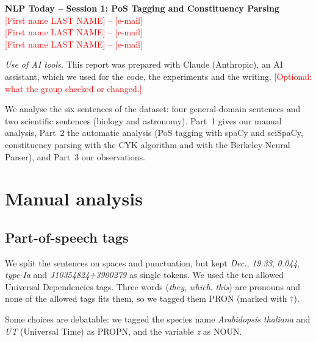 \documentclass[11pt,a4paper]{article}
\begin{document}
\begin{center}
  {\Large\bfseries NLP Today -- Session 1: PoS Tagging and Constituency Parsing}\\[8pt]
  \textcolor{red}{[First name LAST NAME] -- [e-mail]}\\
  \textcolor{red}{[First name LAST NAME] -- [e-mail]}\\
  \textcolor{red}{[First name LAST NAME] -- [e-mail]}
\end{center}

\noindent\textit{Use of AI tools.} This report was prepared with Claude (Anthropic), an AI assistant, which we used for the code, the experiments and the writing. \textcolor{red}{[Optional: what the group checked or changed.]}

\medskip
\noindent We analyse the six sentences of the dataset: four general-domain sentences and two scientific sentences (biology and astronomy). Part~1 gives our manual analysis, Part~2 the automatic analysis (PoS tagging with spaCy and sciSpaCy, constituency parsing with the CYK algorithm and with the Berkeley Neural Parser), and Part~3 our observations.

\section{Manual analysis}

\subsection{Part-of-speech tags}
We split the sentences on spaces and punctuation, but kept \emph{Dec.}, \emph{19.33}, \emph{0.044}, \emph{type-Ia} and \emph{J10354824+3900279} as single tokens. We used the ten allowed Universal Dependencies tags. Three words (\emph{they}, \emph{which}, \emph{this}) are pronouns and none of the allowed tags fits them, so we tagged them PRON (marked with $\dagger$).

{\small\raggedright\par}

\noindent Some choices are debatable: we tagged the species name \emph{Arabidopsis thaliana} and \emph{UT} (Universal Time) as PROPN, and the variable \emph{z} as NOUN.
\end{document}
